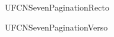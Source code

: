 \documentclass{abntexto-ufc}
\begin{document}
\textual

\noindent UFCNSevenPaginationRecto

\newpage
\noindent UFCNSevenPaginationVerso
\end{document}

